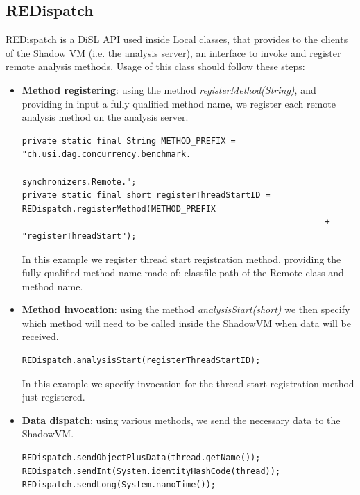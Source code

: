 \documentclass[]{usiinfthesis}
\begin{document}
\subsection{REDispatch}
REDispatch is a DiSL API used inside Local classes, that provides to the clients of the Shadow VM (i.e. the analysis server), an interface to invoke and register remote analysis methods. Usage of this class should follow these steps:
\begin{itemize}
    \item \textbf{Method registering}: using the method \textit{registerMethod(String)}, and providing in input a fully qualified method name, we register each remote analysis method on the analysis server.
    \vspace*{0.5cm}
    \begin{verbatim}
private static final String METHOD_PREFIX = "ch.usi.dag.concurrency.benchmark.
                                                            synchronizers.Remote.";
private static final short registerThreadStartID = REDispatch.registerMethod(METHOD_PREFIX
                                                             + "registerThreadStart");
\end{verbatim}
\vspace*{0.5cm}
    In this example we register thread start registration method, providing the fully qualified method name made of: classfile path of the Remote class and method name.
    \item \textbf{Method invocation}: using the method \textit{analysisStart(short)} we then specify which method will need to be called inside the ShadowVM when data will be received.
    \vspace*{0.5cm}
    \begin{verbatim}
REDispatch.analysisStart(registerThreadStartID);
\end{verbatim}
\vspace*{0.5cm}
    In this example we specify invocation for the thread start registration method just registered.
    \item \textbf{Data dispatch}: using various methods, we send the necessary data to the ShadowVM.
    \vspace*{0.5cm}
    \begin{verbatim}
REDispatch.sendObjectPlusData(thread.getName());
REDispatch.sendInt(System.identityHashCode(thread));
REDispatch.sendLong(System.nanoTime());
\end{verbatim}

\end{itemize}
\end{document}
